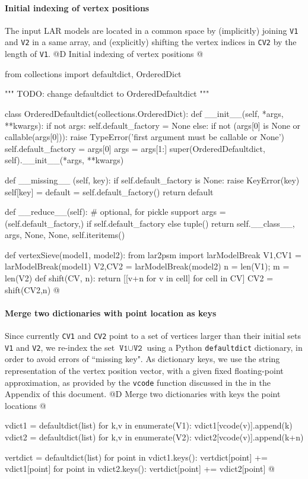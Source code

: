 \documentclass[11pt,oneside]{article}	%
\begin{document}
\paragraph{Initial indexing of vertex positions}
The input LAR models are located in a common space by (implicitly) joining \texttt{V1} and \texttt{V2} in a same array, and (explicitly) shifting the vertex indices in \texttt{CV2} by the length of \texttt{V1}.
@D Initial indexing of vertex positions
@{from collections import defaultdict, OrderedDict

""" TODO: change defaultdict to OrderedDefaultdict """

class OrderedDefaultdict(collections.OrderedDict):
    def __init__(self, *args, **kwargs):
        if not args:
            self.default_factory = None
        else:
            if not (args[0] is None or callable(args[0])):
                raise TypeError('first argument must be callable or None')
            self.default_factory = args[0]
            args = args[1:]
        super(OrderedDefaultdict, self).__init__(*args, **kwargs)

    def __missing__ (self, key):
        if self.default_factory is None:
            raise KeyError(key)
        self[key] = default = self.default_factory()
        return default

    def __reduce__(self):  # optional, for pickle support
        args = (self.default_factory,) if self.default_factory else tuple()
        return self.__class__, args, None, None, self.iteritems()


def vertexSieve(model1, model2):
	from lar2psm import larModelBreak
	V1,CV1 = larModelBreak(model1) 
	V2,CV2 = larModelBreak(model2)
	n = len(V1); m = len(V2)
	def shift(CV, n): 
		return [[v+n for v in cell] for cell in CV]
	CV2 = shift(CV2,n)
@}

\paragraph{Merge two dictionaries with point location as keys}
Since currently \texttt{CV1} and \texttt{CV2} point to a set of vertices larger than their initial sets 
\texttt{V1} and \texttt{V2}, we re-index the set $\texttt{V1} \cup \texttt{V2}$ using a Python \texttt{defaultdict} dictionary, in order to avoid errors of ``missing key". As dictionary keys, we use the string representation of the vertex position vector, with a given fixed floating-point approximation, as provided by the \texttt{vcode} function discussed in the in the Appendix of this document.
@D Merge two dictionaries with keys the point locations
@{	
	vdict1 = defaultdict(list)
	for k,v in enumerate(V1): vdict1[vcode(v)].append(k) 
	vdict2 = defaultdict(list)
	for k,v in enumerate(V2): vdict2[vcode(v)].append(k+n) 
	
	vertdict = defaultdict(list)
	for point in vdict1.keys(): vertdict[point] += vdict1[point]
	for point in vdict2.keys(): vertdict[point] += vdict2[point]
@}
\end{document}
